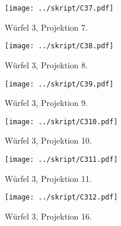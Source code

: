 \begin{figure}[htbp]
	\begin{minipage}{0.5\textwidth} 
	\texttt{[image: ../skript/C37.pdf]}
	\caption{Würfel 3, Projektion 7.}
	\end{minipage}
	\hfill
	\begin{minipage}{0.5\textwidth}
	\texttt{[image: ../skript/C38.pdf]}
	\caption{Würfel 3, Projektion 8.}
	\end{minipage}
\end{figure}

\begin{figure}[htbp]
	\begin{minipage}{0.5\textwidth} 
	\texttt{[image: ../skript/C39.pdf]}
	\caption{Würfel 3, Projektion 9.}
	\end{minipage}
	\hfill
	\begin{minipage}{0.5\textwidth}
	\texttt{[image: ../skript/C310.pdf]}
	\caption{Würfel 3, Projektion 10.} 
	\end{minipage}
\end{figure}

\begin{figure}[htbp]
	\begin{minipage}{0.5\textwidth} 
	\texttt{[image: ../skript/C311.pdf]}
	\caption{Würfel 3, Projektion 11.}
	\end{minipage}
	\hfill
	\begin{minipage}{0.5\textwidth}
	\texttt{[image: ../skript/C312.pdf]}
	\caption{Würfel 3, Projektion 16.}
	\end{minipage}
\end{figure}